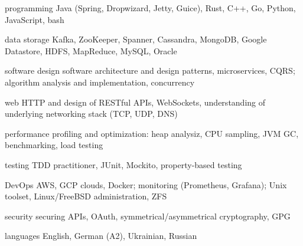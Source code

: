 

\begin{cvskills}

  \cvskill
    {programming} %
    {Java (Spring, Dropwizard, Jetty, Guice), Rust, C++, Go, Python, JavaScript, bash} %

  \cvskill
    {data storage} %
    {Kafka, ZooKeeper, Spanner, Cassandra, MongoDB, Google Datastore, HDFS, MapReduce, MySQL, Oracle} %

  \cvskill
    {software design} %
    {software architecture and design patterns, microservices, CQRS; algorithm analysis and implementation, concurrency} %

  \cvskill
    {web} %
    {HTTP and design of RESTful APIs, WebSockets, understanding of underlying networking stack (TCP, UDP, DNS)} %

  \cvskill
    {performance} %
    {profiling and optimization: heap analysiz, CPU sampling, JVM GC, benchmarking, load testing} %

  \cvskill
    {testing} %
    {TDD practitioner, JUnit, Mockito, property-based testing} %

  \cvskill
    {DevOps} %
		{AWS, GCP clouds, Docker; monitoring (Prometheus, Grafana); Unix toolset, Linux/FreeBSD administration, ZFS} %

  \cvskill
    {security} %
    {securing APIs, OAuth, symmetrical/asymmetrical cryptography, GPG} %

  \cvskill
    {languages} %
    {English, German (A2), Ukrainian, Russian} %

\end{cvskills}
